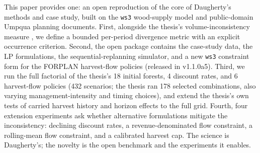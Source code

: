 This paper provides one: an open reproduction of the core of Daugherty's methods and case study, built on the \texttt{ws3} wood-supply model \citep{paradis2026ws3} and public-domain Umpqua planning documents. First, alongside the thesis's volume-inconsistency measure \citep[eq.~5-1]{daugherty1991credibility}, we define a bounded per-period divergence metric with an explicit occurrence criterion. Second, the open package contains the case-study data, the LP formulations, the sequential-replanning simulator, and a new \texttt{ws3} constraint form for the FORPLAN harvest-flow policies (released in v1.1.0a5). Third, we run the full factorial of the thesis's 18 initial forests, 4 discount rates, and 6 harvest-flow policies (432 scenarios; the thesis ran 178 selected combinations, also varying management-intensity and timing choices), and extend the thesis's own tests of carried harvest history and horizon effects \citep[pp.~120, 123]{daugherty1991credibility} to the full grid. Fourth, four extension experiments ask whether alternative formulations mitigate the inconsistency: declining discount rates, a revenue-denominated flow constraint, a rolling-mean flow constraint, and a calibrated harvest cap. The science is Daugherty's; the novelty is the open benchmark and the experiments it enables.
